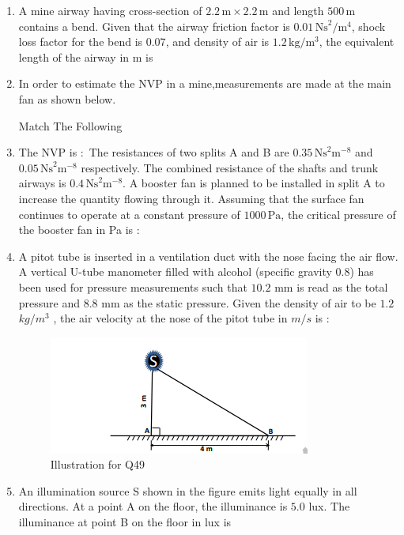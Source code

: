 \documentclass[journal,12pt,onecolumn]{IEEEtran}
\theoremstyle{remark}
\begin{document}
\begin{enumerate}
\item  A mine airway having cross-section of $2.2 \,\text{m} \times 2.2 \,\text{m}$ 
and length $500 \,\text{m}$ contains a bend. 
Given that the airway friction factor is $0.01 \,\text{Ns}^2\!/\text{m}^4$, 
shock loss factor for the bend is $0.07$, 
and density of air is $1.2 \,\text{kg}/\text{m}^3$, 
the equivalent length of the airway in m is

\hfill{}
\item  In order to estimate the NVP in a mine,measurements are made at the main fan as shown below.
\begin{table}[H]
  \centering
  \caption{Match The Following}
  
  \label{tab:Table3}
\end{table}

\hfill{}
\item The NVP is $\colon$
The resistances of two splits A and B are 
$0.35 \,\text{Ns}^2\text{m}^{-8}$ and 
$0.05 \,\text{Ns}^2\text{m}^{-8}$ respectively. 
The combined resistance of the shafts and trunk airways is 
$0.4 \,\text{Ns}^2\text{m}^{-8}$. 
A booster fan is planned to be installed in split A to increase the quantity flowing through it. 
Assuming that the surface fan continues to operate at a constant pressure of $1000 \,\text{Pa}$, 
the critical pressure of the booster fan in Pa is $\colon$

\hfill{}
\item A pitot tube is inserted in a ventilation duct with the nose facing the air flow. A vertical U-tube
manometer filled with alcohol (specific gravity $0.8$) has been used for pressure measurements such that $10.2$ mm is read as the total pressure and 8.8 mm as the static pressure. Given the density of air to be $1.2$ $kg/m^3$
, the air velocity at the nose of the pitot tube in $m/s$ is $\colon$

\hfill{}
\begin{figure}[H]
  \centering
  \includegraphics[width=0.4\columnwidth]{figs/figtri.png}
  \caption{Illustration for Q49}
  \label{fig:tri}
\end{figure}
\item An illumination source S shown in the figure emits light equally in all directions. At a point A on
the floor, the illuminance is $5.0$ lux. The illuminance at point B on the floor in lux is


\end{enumerate}
\end{document}

